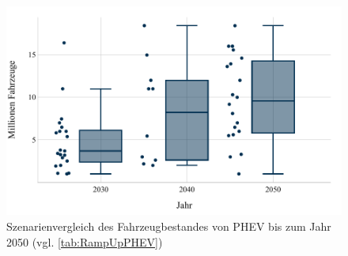 \begin{figure}[H]
    \centering
    \includegraphics[width=\textwidth]{Bilder/RampUp-PHEV-MA}
    \caption[Szenarienvergleich des Fahrzeugbestandes von PHEV bis zum Jahr \num{2050}]{Szenarienvergleich des Fahrzeugbestandes von PHEV bis zum Jahr \num{2050} (vgl. \autoref{tab:RampUpPHEV})}\label{fig:RampUpPHEV}
\end{figure}